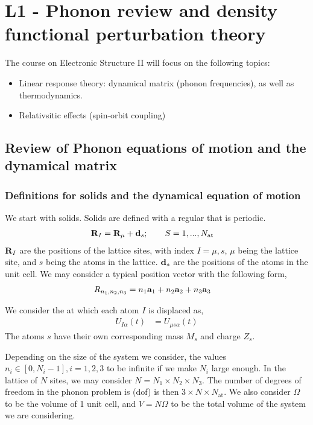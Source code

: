 \section{L1 - Phonon review and density functional perturbation theory}

The course on Electronic Structure II will focus on the following topics:
\begin{itemize}
    \item Linear response theory: dynamical matrix (phonon frequencies), as well as thermodynamics.
    \item Relativsitic effects (spin-orbit coupling) 
\end{itemize}

\subsection{Review of Phonon equations of motion and the dynamical matrix}

\subsubsection{Definitions for solids and the dynamical equation of motion}
We start with solids. Solids are defined with a regular  that is periodic.
\begin{align}
    \mathbf{R}_I &= \mathbf{R}_\mu + \mathbf{d}_s;\qquad S = 1,...,N_\text{at} \label{eq:esii01_position0}
\end{align}
$\mathbf{R}_I$ are the positions of the lattice sites, with index $I={\mu,s}$, $\mu$ being the lattice site, and $s$ being the atoms in the lattice.  $\mathbf{d}_s$ are the positions of the atoms in the unit cell. We may consider a typical position vector with the following form,
\begin{align}
    R_{n_1,n_2,n_3} &= n_1\mathbf{a}_1 + n_2\mathbf{a}_2 + n_3\mathbf{a}_3
\end{align}

We consider the  at which each atom $I$ is displaced as,
\begin{align}
    U_{I\alpha}(t) &= U_{\mu s\alpha}(t) \label{eq:esii01_displacement0}
\end{align}
The atoms $s$ have their own corresponding mass $M_s$ and charge $Z_s$.

Depending on the size of the system we consider, the values $n_i\in\left[0,N_i-1\right], i=1,2,3$ to be infinite if we make $N_i$ large enough. In the lattice of $N$ sites, we may consider $N=N_1\times N_2\times N_3$. The number of degrees of freedom in the phonon problem is (dof) is then $3\times N\times N_\text{at}$. We also consider $\Omega$ to be the volume of 1 unit cell, and $V=N\Omega$ to be the total volume of the system we are considering. 


